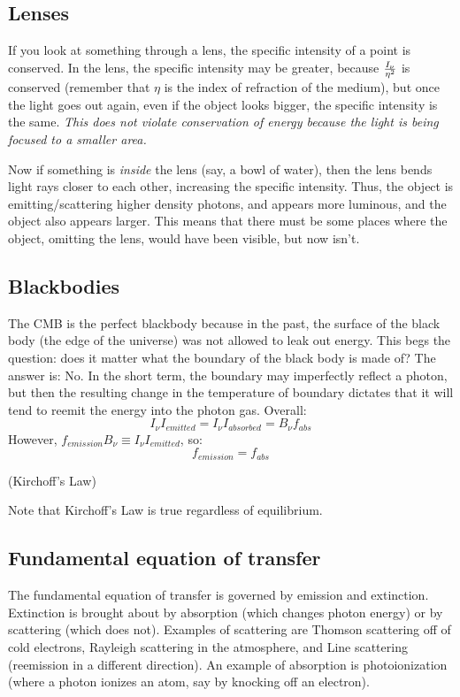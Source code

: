 \documentclass[11pt]{article}
\begin{document}
\subsection*{ Lenses}

If you look at something through a lens, the specific intensity of a point
is conserved.  In the lens, the specific intensity may be greater, because
$I_\nu\over\eta^2$ is conserved (remember that $\eta$ is the index of
refraction of the medium), but once the light goes out again, even if the
object looks bigger, the specific intensity is the same.  {\it This does not
violate conservation of energy because the light is being focused to
a smaller area.}\par

Now if something is {\it inside} the lens (say, a bowl of water), then
the lens bends light rays closer to each other, increasing the specific
intensity.  Thus, the object is emitting/scattering higher density photons,
and appears more luminous, and the object also appears larger.  This means
that there must be some places where the object, omitting the lens, would have
been visible, but now isn't.

\subsection*{ Blackbodies}

The CMB is the perfect blackbody because in the past, the surface of the 
black body (the edge of the universe) was not allowed to leak out energy.
This begs the question:
does it matter what the boundary of the black body is made of?
The answer is: No. In the short term, the boundary may imperfectly reflect 
a photon,
but then the resulting change in the temperature of boundary dictates that
it will tend to reemit the energy into the photon gas. Overall:
$$I_\nu I_{emitted}=I_\nu I_{absorbed}=B_\nu f_{abs}$$
However, $f_{emission}B_\nu\equiv I_\nu I_{emitted}$, so:
$$\boxed{f_{emission}=f_{abs}}$$
\centerline{(Kirchoff's Law)}\par
Note that Kirchoff's Law is true regardless of equilibrium.

\subsection*{ Fundamental equation of transfer}

The fundamental equation of transfer is governed by emission and extinction. 
Extinction is brought about by absorption (which changes photon energy) or
by scattering (which does not).  Examples of scattering are Thomson scattering
off of cold electrons, Rayleigh scattering in the atmosphere, and Line
scattering (reemission in a different direction). 
An example of absorption is photoionization (where a photon ionizes an atom, 
say by knocking off an electron).\par
\end{document}
